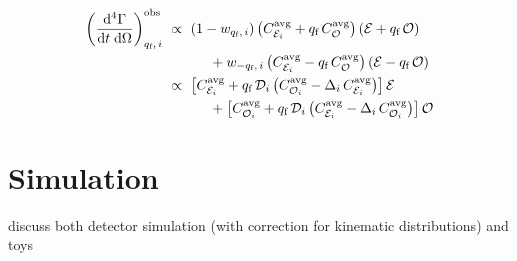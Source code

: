\begin{equation}
  \begin{aligned}
    \label{eq:diffRateObs}
    \left(\frac{\ud^{4} \Gamma}{\ud t \;\ud\Omega}\right)_{\qf,\,i}^{\text{obs}}\
      &\propto\ (1-\wTag[\qf,\,i]) \left(\avgCEven[i] + \qf\,\avgCOdd\right)\left(\even + \qf\,\odd\right) \\
      &\qquad\quad+ \wTag[-\qf,\,i] \left(\avgCEven[i] - \qf\,\avgCOdd\right)\left(\even - \qf\,\odd\right) \\
    &\propto\ \left[\avgCEven[i] + \qf\,\dil[i]\left(\avgCOdd[i] - \ADilWTag[i]\,\avgCEven[i]\right)\right]\even \\
      &\qquad\quad+ \left[\avgCOdd[i] + \qf\,\dil[i]\left(\avgCEven[i] - \ADilWTag[i]\,\avgCOdd[i]\right)\right]\odd
  \end{aligned}
\end{equation}


\section{Simulation}
\label{sec:ana_sim}
discuss both detector simulation (with correction for kinematic distributions) and toys

